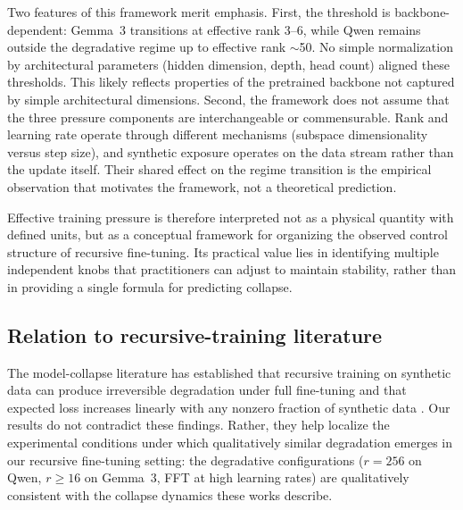 \documentclass[a4paper,fleqn]{cas-dc}
\begin{document}
Two features of this framework merit emphasis. First, the threshold is
backbone-dependent: Gemma~3 transitions at effective rank 3--6, while Qwen
remains outside the degradative regime up to effective rank ${\sim}$50. No simple normalization by architectural
parameters (hidden dimension, depth, head count) aligned these thresholds. This
likely reflects properties of the pretrained backbone not captured by simple
architectural dimensions. Second, the framework does not assume that the three
pressure components are interchangeable or commensurable. Rank and learning rate
operate through different mechanisms (subspace dimensionality versus step size),
and synthetic exposure operates on the data stream rather than the update
itself. Their shared effect on the regime transition is the empirical
observation that motivates the framework, not a theoretical prediction.

Effective training pressure is therefore interpreted not as a physical quantity
with defined units, but as a conceptual framework for organizing the observed
control structure of recursive fine-tuning. Its practical value lies in
identifying multiple independent knobs that practitioners can adjust to maintain
stability, rather than in providing a single formula for predicting collapse.

\subsection{Relation to recursive-training literature}\label{sec:disc_literature}

The model-collapse literature has established that recursive training on
synthetic data can produce irreversible degradation under full fine-tuning
\citep{shumailov2024} and that expected loss increases linearly with any
nonzero fraction of synthetic data \citep{dohmatob2025}. Our results do not
contradict these findings. Rather, they help localize the experimental
conditions under which qualitatively similar degradation emerges in our
recursive fine-tuning setting: the degradative configurations ($r=256$ on Qwen,
$r \geq 16$ on Gemma~3, FFT at high learning rates) are qualitatively
consistent with the collapse dynamics these works describe.
\end{document}
